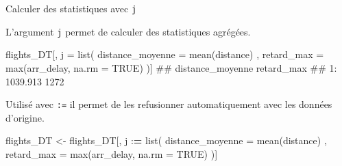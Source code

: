 \documentclass[12pt,handout,ignorenonframetext,]{beamer}
\newenvironment{Shaded}{}{}
\newcommand{\KeywordTok}[1]{\textcolor[rgb]{0.00,0.00,1.00}{{#1}}}
\newcommand{\DataTypeTok}[1]{{#1}}
\newcommand{\StringTok}[1]{\textcolor[rgb]{0.00,0.50,0.50}{{#1}}}
\newcommand{\OtherTok}[1]{\textcolor[rgb]{1.00,0.25,0.00}{{#1}}}
\newcommand{\ErrorTok}[1]{\textcolor[rgb]{1.00,0.00,0.00}{\textbf{{#1}}}}
\newcommand{\NormalTok}[1]{{#1}}
\renewenvironment{Shaded}{\begin{snugshade}}{\end{snugshade}}
\begin{document}
\begin{frame}[fragile]{Calculer des statistiques avec \texttt{j}}

L'argument \texttt{j} permet de calculer des statistiques agrégées.

\small

\begin{Shaded}
\begin{Highlighting}[]
\NormalTok{flights_DT[, j =}\StringTok{ }\KeywordTok{list}\NormalTok{(}
  \DataTypeTok{distance_moyenne =} \KeywordTok{mean}\NormalTok{(distance)}
  \NormalTok{, }\DataTypeTok{retard_max =} \KeywordTok{max}\NormalTok{(arr_delay, }\DataTypeTok{na.rm =} \OtherTok{TRUE}\NormalTok{)}
\NormalTok{)]}
  \NormalTok{##    distance_moyenne retard_max}
  \NormalTok{## 1:         1039.913       1272}
\end{Highlighting}
\end{Shaded}

\normalsize 

Utilisé avec \texttt{:=} il permet de les refusionner automatiquement
avec les données d'origine.

\small

\begin{Shaded}
\begin{Highlighting}[]
\NormalTok{flights_DT <-}\StringTok{ }\NormalTok{flights_DT[, j :}\ErrorTok{=}\StringTok{ }\KeywordTok{list}\NormalTok{(}
  \DataTypeTok{distance_moyenne =} \KeywordTok{mean}\NormalTok{(distance)}
  \NormalTok{, }\DataTypeTok{retard_max =} \KeywordTok{max}\NormalTok{(arr_delay, }\DataTypeTok{na.rm =} \OtherTok{TRUE}\NormalTok{)}
\NormalTok{)]}
\end{Highlighting}
\end{Shaded}

\end{frame}
\end{document}
